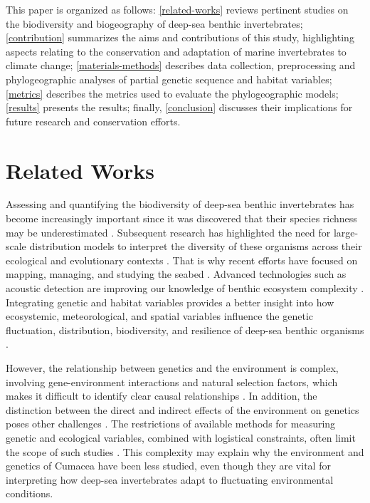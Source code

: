 This paper is organized as follows: \autoref{related-works} reviews pertinent studies on the biodiversity and biogeography of deep-sea benthic invertebrates; \autoref{contribution} summarizes the aims and contributions of this study, highlighting aspects relating to the conservation and adaptation of marine invertebrates to climate change; \autoref{materials-methods} describes data collection, preprocessing and phylogeographic analyses of partial genetic sequence and habitat variables; \autoref{metrics} describes the metrics used to evaluate the phylogeographic models; \autoref{results} presents the results; finally, \autoref{conclusion} discusses their implications for future research and conservation efforts.

\section{Related Works}\label{related-works}
Assessing and quantifying the biodiversity of deep-sea benthic invertebrates has become increasingly important since it was discovered that their species richness may be underestimated \citep{grassle1992deep}. Subsequent research has highlighted the need for large-scale distribution models to interpret the diversity of these organisms across their ecological and evolutionary contexts \citep{rex1997large}. That is why recent efforts have focused on mapping, managing, and studying the seabed \citep{brown2011benthic}. Advanced technologies such as acoustic detection are improving our knowledge of benthic ecosystem complexity \citep{brown2011benthic}. Integrating genetic and habitat variables provides a better insight into how ecosystemic, meteorological, and spatial variables influence the genetic fluctuation, distribution, biodiversity, and resilience of deep-sea benthic organisms \citep{vrijenhoek2009cryptic}.

However, the relationship between genetics and the environment is complex, involving gene-environment interactions and natural selection factors, which makes it difficult to identify clear causal relationships \citep{balkenhol_identifying_2009}. In addition, the distinction between the direct and indirect effects of the environment on genetics poses other challenges \citep{manel_perspectives_2010, balkenhol_landscape_2019}. The restrictions of available methods for measuring genetic and ecological variables, combined with logistical constraints, often limit the scope of such studies \citep{manel_perspectives_2010, shafer_widespread_2013}. This complexity may explain why the environment and genetics of Cumacea have been less studied, even though they are vital for interpreting how deep-sea invertebrates adapt to fluctuating environmental conditions.

